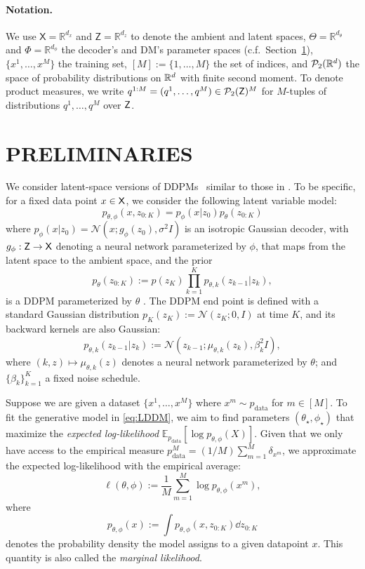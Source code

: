 \documentclass[twoside]{article}
\begin{document}
\paragraph{Notation.} We use $\mathsf{X} = \mathbb{R}^{d_x}$ and $\mathsf{Z} = \mathbb{R}^{d_z}$ to denote the ambient and latent spaces, $\Theta = \mathbb{R}^{d_\theta}$ and $\Phi = \mathbb{R}^{d_\phi}$ the decoder's and \gls*{DM}'s parameter spaces (c.f.~Section~\ref{sec:dldm}), $\{x^1,\dots,x^M\}$ the training set, $[M]:=\{1,\dots,M\}$ the set of indices, and $\mathcal{P}_2(\mathbb{R}^d)$ the space of probability distributions on $\mathbb{R}^d$ with finite second moment. To denote product measures, we write $q^{1:M} = (q^1, \dots, q^M) \in \mathcal{P}_2({\mathsf{Z}})^M$ for $M$-tuples of distributions $q^1, \dots, q^M$ over ${\mathsf{Z}}$. 

\section{PRELIMINARIES}\label{sec:dldm}

We consider latent-space versions of \glspl*{DDPM}~\citep{hodenoisingdiffusionprobabilistic2020} similar to those in \cite{rombachhighresolutionimagesynthesis2022, vahdatscorebasedgenerativemodeling2021,wehenkeldiffusionpriorsvariational2021}. To be specific, for a fixed data point $x \in {\mathsf{X}}$, we consider the following latent variable model:
\begin{equation}\label{eq:LDDM}
    p_{\theta, \phi}(x, z_{0:K}) = p_{\phi}(x|z_{0}) p_{\theta}(z_{0:K})
\end{equation}
where ${p_{\phi}(x|z_{0}) = \mathcal{N}(x; g_\phi(z_0),\sigma^2 I)}$ is an isotropic Gaussian decoder, with $g_\phi: {\mathsf{Z}} \to {\mathsf{X}}$ 
denoting a neural network parameterized by $\phi$, that  maps from the latent space to the ambient space, and the prior
$$p_{\theta}(z_{0:K}) := p(z_K) \prod_{k=1}^K p_{\theta, k}(z_{k-1}|z_k),$$
is a \gls*{DDPM} parameterized by $\theta$ \citep{hodenoisingdiffusionprobabilistic2020}. The \gls*{DDPM} end point is defined with a standard Gaussian distribution $p_K (z_{K}):=\mathcal{N}(z_K; 0, I)$ at time $K$, and its backward kernels are also Gaussian: $$p_{\theta, k}(z_{k-1}|z_{k}):=\mathcal{N}(z_{k-1}; \mu_{\theta, k}(z_k), \beta_k^2 I),$$ where $(k,z)\mapsto\mu_{\theta, k}(z)$ denotes a neural network parameterized by $\theta$; and $\{\beta_k\}_{k=1}^K$ a fixed noise schedule.

Suppose we are given a dataset $\{x^1,\dots,x^M\}$ where $x^m \sim p_{\text{data}}$ for $m \in [M]$. To fit the generative model in \eqref{eq:LDDM}, we aim to find parameters $(\theta_\star,\phi_\star)$ that maximize the \emph{expected log-likelihood} $\mathbb{E}_{p_{\text{data}}}[\log p_{\theta,\phi}(X)]$. Given that we only have access to the empirical measure $p_{\text{data}}^M = (1/M) \sum_{m=1}^M \delta_{x^m}$, we approximate the expected log-likelihood with the empirical average:
\begin{equation}\label{eq:ell}
    \ell(\theta,\phi):=\frac{1}{M}\sum_{m=1}^M\log p_{\theta,\phi}(x^m),
\end{equation}
where $$p_{\theta,\phi}(x):=\int p_{\theta,\phi}(x,z_{0:K}) \dd z_{0:K}$$ denotes the probability density the model assigns to a given datapoint $x$. This quantity is also called the \emph{marginal likelihood}.
\end{document}
